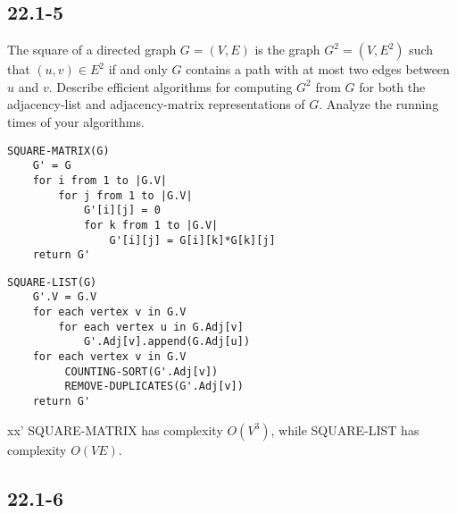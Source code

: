 \documentclass[11pt]{article}
\begin{document}
\subsection*{22.1-5}

The square of a directed graph $G = (V, E)$ is the graph $G^2 = (V, E^2)$ such that $(u, v) \in E^2$ if and only $G$ contains a path with at most two edges between $u$ and $v$. Describe efficient algorithms  for computing $G^2$ from $G$ for both the adjacency-list and adjacency-matrix representations of $G$. Analyze the running times of your algorithms.

\begin{lstlisting}
SQUARE-MATRIX(G)
	G' = G
	for i from 1 to |G.V|
		for j from 1 to |G.V|
			G'[i][j] = 0
			for k from 1 to |G.V|
				G'[i][j] = G[i][k]*G[k][j] 
	return G'
\end{lstlisting}

\begin{lstlisting}
SQUARE-LIST(G)
	G'.V = G.V
	for each vertex v in G.V
		for each vertex u in G.Adj[v]
			G'.Adj[v].append(G.Adj[u])
	for each vertex v in G.V
		 COUNTING-SORT(G'.Adj[v])
		 REMOVE-DUPLICATES(G'.Adj[v])
	return G'
\end{lstlisting}
xx'
SQUARE-MATRIX has complexity $O(V^3)$, while SQUARE-LIST has complexity $O(VE)$.


\subsection*{22.1-6}
\end{document}
